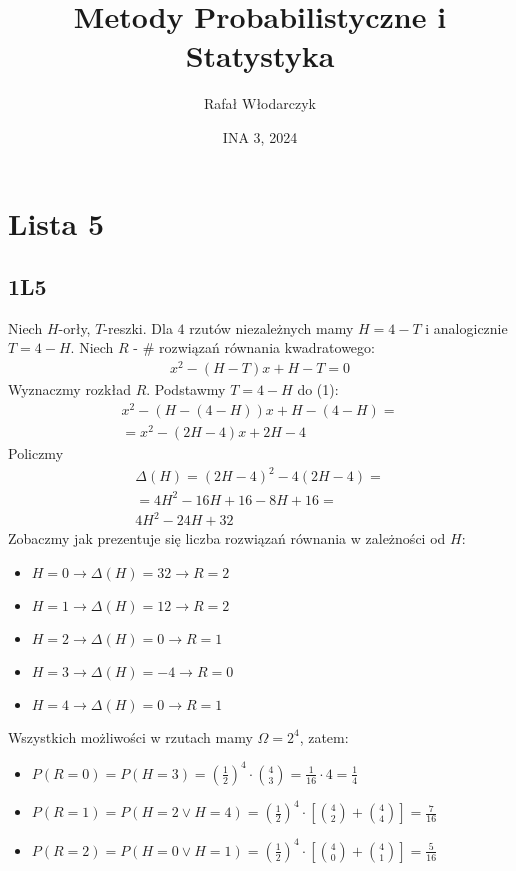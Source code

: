 \documentclass{article}
\title{Metody Probabilistyczne i Statystyka}
\author{Rafał Włodarczyk}
\date{INA 3, 2024}
\begin{document}
\maketitle

\tableofcontents

\newpage

\section{Lista 5}

\subsection{1L5}

Niech $H$-orły, $T$-reszki. Dla $4$ rzutów niezależnych mamy $H=4-T$ i analogicznie $T=4-H$.
Niech $R$ - $\#$ rozwiązań równania kwadratowego:
\begin{align}
    x^2 - (H-T)x + H-T = 0
\end{align}
Wyznaczmy rozkład $R$. Podstawmy $T=4-H$ do (1):
\begin{align}
    x^2 - (H-(4-H))x + H - (4-H) =\\
    = x^2 - (2H - 4)x + 2H - 4
\end{align}
Policzmy
\begin{align}
    \Delta(H) = (2H-4)^2 - 4(2H-4) =\\
    = 4H^2 - 16H + 16 - 8H + 16 = \\
    4H^2 - 24H + 32
\end{align}
Zobaczmy jak prezentuje się liczba rozwiązań równania w zależności od $H$:
\begin{itemize}
    \item $H=0 \rightarrow \Delta(H) = 32 \rightarrow R=2$
    \item $H=1 \rightarrow \Delta(H) = 12 \rightarrow R=2$
    \item $H=2 \rightarrow \Delta(H) = 0 \rightarrow R=1$
    \item $H=3 \rightarrow \Delta(H) = -4 \rightarrow R=0$
    \item $H=4 \rightarrow \Delta(H) = 0 \rightarrow R=1$
\end{itemize}
Wszystkich możliwości w rzutach mamy $\Omega = 2^4$, zatem:
\begin{itemize}
    \item $P(R=0) = P(H=3) = (\frac{1}{2})^4\cdot \binom{4}{3} = \frac{1}{16} \cdot 4 = \frac{1}{4}$
    \item $P(R=1) = P(H=2\lor H=4) = (\frac{1}{2})^4\cdot\left[\binom{4}{2} +\binom{4}{4}\right]= \frac{7}{16}$
    \item $P(R=2) = P(H=0\lor H=1) = (\frac{1}{2})^4\cdot\left[\binom{4}{0} +\binom{4}{1}\right]= \frac{5}{16}$
\end{itemize}
\end{document}
